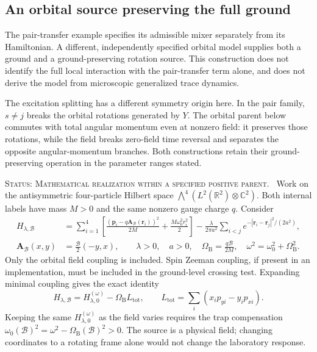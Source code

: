 \documentclass[11pt,reqno]{scrartcl}
\newcommand{\CC}{\mathbb C}
\newcommand{\statuslabel}[1]{\par\smallskip\noindent\textsc{Status: #1.}\ }
\theoremstyle{plain}
\theoremstyle{definition}
\theoremstyle{remark}
\begin{document}
\subsection{An orbital source preserving the full ground}
\label{sec:orbital-ground-source}

The pair-transfer example specifies its admissible mixer separately from
its Hamiltonian.  A different, independently specified orbital model
supplies both a ground and a ground-preserving rotation source.  This
construction does not identify the full local interaction with the
pair-transfer term alone, and does not derive the model from microscopic
generalized trace dynamics.

The excitation splitting has a different symmetry origin here.
In the pair family, $s\ne j$ breaks the orbital rotations generated
by $Y$.  The orbital parent below commutes with total angular momentum
even at nonzero field: it preserves those rotations, while the field
breaks zero-field time reversal and separates the opposite angular-momentum
branches.  Both constructions retain their ground-preserving operation
in the parameter ranges stated.

\statuslabel{Mathematical realization within a specified positive parent}
Work on the antisymmetric four-particle Hilbert space
\(\bigwedge^4(L^2(\mathbb R^2)\otimes\CC^2)\).  Both internal labels
have mass \(M>0\) and the same nonzero gauge charge \(q\).  Consider
\begin{align}
 H_{\lambda,\mathcal B}
 &=\sum_{i=1}^4\left[
 \frac{(\mathbf p_i-q\mathbf A_{\mathcal B}(\mathbf r_i))^2}{2M}
 +\frac{M\omega_0^2r_i^2}{2}\right]
 -\frac{\lambda}{2\pi a^2}\sum_{i<j}
 e^{-|\mathbf r_i-\mathbf r_j|^2/(2a^2)},
 \label{eq:orbital-parent}\\
 \mathbf A_{\mathcal B}(x,y)&=\frac{\mathcal B}{2}(-y,x),\qquad
 \lambda>0,\quad a>0,\quad
 \Omega_{\mathrm B}=\frac{q\mathcal B}{2M},\quad
 \omega^2=\omega_0^2+\Omega_{\mathrm B}^2.
 \label{eq:orbital-bias-parameters}
\end{align}
Only the orbital field coupling is included.  Spin Zeeman coupling, if
present in an implementation, must be included in the ground-level
crossing test.  Expanding minimal coupling gives the exact identity
\begin{equation}
 H_{\lambda,\mathcal B}
 =H_{\lambda,0}^{(\omega)}-\Omega_{\mathrm B}L_{\mathrm{tot}},
 \qquad L_{\mathrm{tot}}=\sum_i(x_ip_{yi}-y_ip_{xi}).
 \label{eq:orbital-minimal-coupling}
\end{equation}
Keeping the same \(H_{\lambda,0}^{(\omega)}\) as the field varies
requires the trap compensation
\(\omega_0(\mathcal B)^2=\omega^2-\Omega_{\mathrm B}(\mathcal B)^2>0\).
The source is a physical field; changing coordinates to a rotating frame
alone would not change the laboratory response.
\end{document}
